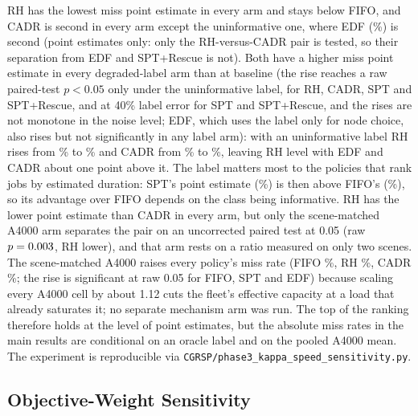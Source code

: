 {\begin{table}[htbp]
\centering
\caption[Complexity-label and A4000 speed sensitivity]{Deadline miss rate (\%) under complexity-label noise and a scene-matched A4000 speed, hectic day, $C_{\max}=5$, ten paired seeds. FIFO ignores the label.}
\label{tab:kappa_speed_sensitivity}
\small

\end{table}

RH has the lowest miss point estimate in every arm and stays below FIFO, and CADR is second in every arm except the uninformative one, where EDF (\KsUninfEDFMiss\%) is second (point estimates only: only the RH-versus-CADR pair is tested, so their separation from EDF and SPT+Rescue is not). Both have a higher miss point estimate in every degraded-label arm than at baseline (the rise reaches a raw paired-test $p<0.05$ only under the uninformative label, for RH, CADR, SPT and SPT+Rescue, and at 40\% label error for SPT and SPT+Rescue, and the rises are not monotone in the noise level; EDF, which uses the label only for node choice, also rises but not significantly in any label arm): with an uninformative label RH rises from \KsBaseRHMiss\% to \KsUninfRHMiss\% and CADR from \KsBaseCADRMiss\% to \KsUninfCADRMiss\%, leaving RH level with EDF and CADR about one point above it. The label matters most to the policies that rank jobs by estimated duration: SPT's point estimate (\KsUninfSPTMiss\%) is then above FIFO's (\KsUninfFIFOMiss\%), so its advantage over FIFO depends on the class being informative. RH has the lower point estimate than CADR in every arm, but only the scene-matched A4000 arm separates the pair on an uncorrected paired test at 0.05 (raw $p=0.003$, RH lower), and that arm rests on a ratio measured on only two scenes. The scene-matched A4000 raises every policy's miss rate (FIFO \KsSlowFIFOMiss\%, RH \KsSlowRHMiss\%, CADR \KsSlowCADRMiss\%; the rise is significant at raw 0.05 for FIFO, SPT and EDF) because scaling every A4000 cell by about 1.12 cuts the fleet's effective capacity at a load that already saturates it; no separate mechanism arm was run. The top of the ranking therefore holds at the level of point estimates, but the absolute miss rates in the main results are conditional on an oracle label and on the pooled A4000 mean. The experiment is reproducible via \texttt{CGRSP/phase3\_kappa\_speed\_sensitivity.py}.

\subsection{Objective-Weight Sensitivity}
\label{ssec:objective-weight-sensitivity}

}
